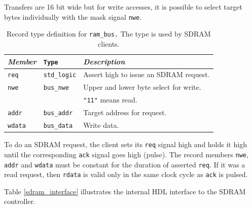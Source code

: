 \documentclass[a4paper]{report}
\begin{document}
Transfers are 16 bit wide but for write accesses, it is
possible to select target bytes individually with the mask
signal \texttt{nwe}.

\begin{table}
\begin{tabular}{*3l}    \toprule
\emph{Member}   & \texttt{Type}         & \emph{Description} \\ \midrule
\texttt{req}    & \texttt{std\_logic}   & Assert high to issue an SDRAM request. \\
\texttt{nwe}    & \texttt{bus\_nwe}     & Upper and lower byte select for write.\\
                &                       & \texttt{"11"} means read. \\
\texttt{addr}   & \texttt{bus\_addr}    & Target address for request. \\
\texttt{wdata}  & \texttt{bus\_data}    & Write data. \\
\bottomrule
 \hline
\end{tabular}
\caption{Record type definition for \texttt{ram\_bus.} The type
is used by SDRAM clients.}
\label{ram_bus_type}
\end{table}

To do an SDRAM request, the client sets its \texttt{req} signal
high and holds it high until the corresponding \texttt{ack}
signal goes high (pulse). The record members \texttt{nwe},
\texttt{addr} and \texttt{wdata} must be constant for the
duration of asserted \texttt{req}.  If it was a read request,
then \texttt{rdata} is valid only in the same clock cycle as
\texttt{ack} is pulsed.

Table \ref{sdram_interface} illustrates the internal HDL
interface to the SDRAM controller.
\end{document}
